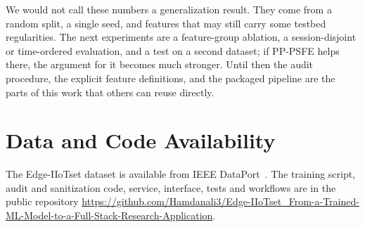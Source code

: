 \documentclass[journal]{IEEEtran}
\begin{document}
We would not call these numbers a generalization result. They come from a random split, a single seed, and features that may still carry some testbed regularities. The next experiments are a feature-group ablation, a session-disjoint or time-ordered evaluation, and a test on a second dataset; if PP-PSFE helps there, the argument for it becomes much stronger. Until then the audit procedure, the explicit feature definitions, and the packaged pipeline are the parts of this work that others can reuse directly.

\section*{Data and Code Availability}
The Edge-IIoTset dataset is available from IEEE DataPort~\cite{ferragdata}. The training script, audit and sanitization code, service, interface, tests and workflows are in the public repository \url{https://github.com/Hamdanali3/Edge-IIoTset_From-a-Trained-ML-Model-to-a-Full-Stack-Research-Application}.



\end{document}
